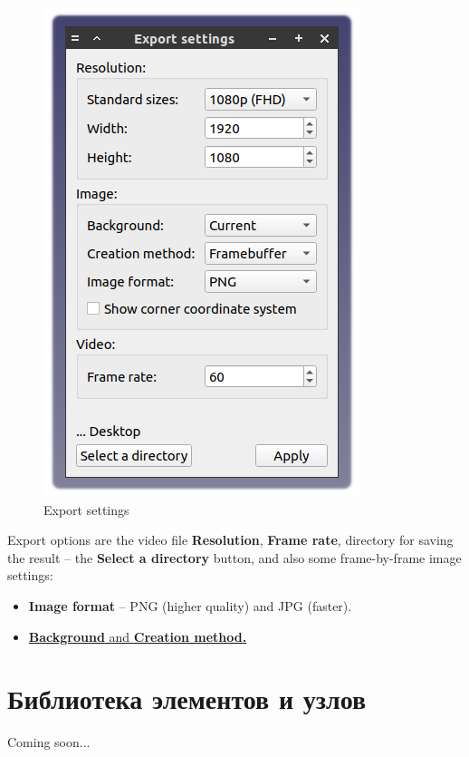 \documentclass[a4paper,12pt]{article}
\begin{document}
\pagebreak




\begin{figure}[htp]
	\centering
	\includegraphics[scale=1]{img/exploded_set.png}
	\caption{Export settings}
	\label{sec:exploded_es}
\end{figure}

Export options are the video file \textbf{Resolution}, \textbf{Frame rate}, directory for saving the result -- the \textbf{Select a directory} button, and also some frame-by-frame image settings:

\begin{itemize}
	\item \textbf{Image format} -- PNG (higher quality) and JPG (faster).
	\item \href{https://wiki.freecad.org/Std_ViewScreenShot}{\textbf{Background} and \textbf{Creation method.}}
\end{itemize}




\section{Библиотека элементов и узлов}
Coming soon...
\end{document}
